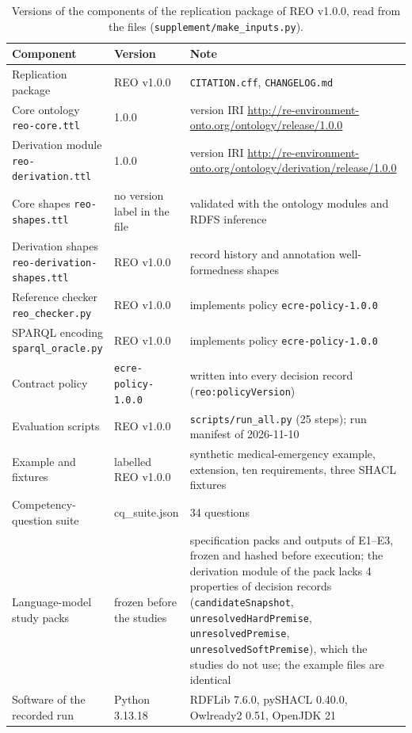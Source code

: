 \begin{table}[H]
\caption{Versions of the components of the replication package of REO v1.0.0, read from the files (\texttt{supplement/make\_inputs.py}).}
\small
\begin{tabular}{@{}L{5.0cm}L{3.6cm}L{7.6cm}@{}}
\toprule
\textbf{Component} & \textbf{Version} & \textbf{Note} \\
\midrule
Replication package & REO v1.0.0 & \texttt{CITATION.cff}, \texttt{CHANGELOG.md} \\
Core ontology \texttt{reo-core.ttl} & 1.0.0 & version IRI \url{http://re-environment-onto.org/ontology/release/1.0.0} \\
Derivation module \texttt{reo-derivation.ttl} & 1.0.0 & version IRI \url{http://re-environment-onto.org/ontology/derivation/release/1.0.0} \\
Core shapes \texttt{reo-shapes.ttl} & no version label in the file & validated with the ontology modules and RDFS inference \\
Derivation shapes \texttt{reo-derivation-shapes.ttl} & REO v1.0.0 & record history and annotation well-formedness shapes \\
Reference checker \texttt{reo\_checker.py} & REO v1.0.0 & implements policy \texttt{ecre-policy-1.0.0} \\
SPARQL encoding \texttt{sparql\_oracle.py} & REO v1.0.0 & implements policy \texttt{ecre-policy-1.0.0} \\
Contract policy & \texttt{ecre-policy-1.0.0} & written into every decision record (\texttt{reo:policyVersion}) \\
Evaluation scripts & REO v1.0.0 & \texttt{scripts/run\_all.py} (25 steps); run manifest of 2026-11-10 \\
Example and fixtures & labelled REO v1.0.0 & synthetic medical-emergency example, extension, ten requirements, three SHACL fixtures \\
Competency-question suite & cq\_suite.json & 34 questions \\
Language-model study packs & frozen before the studies & specification packs and outputs of E1--E3, frozen and hashed before execution; the derivation module of the pack lacks 4 properties of decision records (\texttt{candidateSnapshot}, \texttt{unresolvedHardPremise}, \texttt{unresolvedPremise}, \texttt{unresolvedSoftPremise}), which the studies do not use; the example files are identical \\
Software of the recorded run & Python 3.13.18 & RDFLib 7.6.0, pySHACL 0.40.0, Owlready2 0.51, OpenJDK 21 \\
\bottomrule
\end{tabular}
\end{table}
